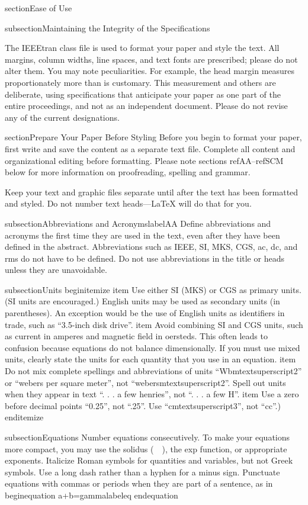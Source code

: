 section{Ease of Use}

subsection{Maintaining the Integrity of the Specifications}

The IEEEtran class file is used to format your paper and style the text. All margins, 
column widths, line spaces, and text fonts are prescribed; please do not 
alter them. You may note peculiarities. For example, the head margin
measures proportionately more than is customary. This measurement 
and others are deliberate, using specifications that anticipate your paper 
as one part of the entire proceedings, and not as an independent document. 
Please do not revise any of the current designations.

section{Prepare Your Paper Before Styling}
Before you begin to format your paper, first write and save the content as a 
separate text file. Complete all content and organizational editing before 
formatting. Please note sections ref{AA}--ref{SCM} below for more information on 
proofreading, spelling and grammar.

Keep your text and graphic files separate until after the text has been 
formatted and styled. Do not number text heads---{LaTeX} will do that 
for you.

subsection{Abbreviations and Acronyms}label{AA}
Define abbreviations and acronyms the first time they are used in the text, 
even after they have been defined in the abstract. Abbreviations such as 
IEEE, SI, MKS, CGS, ac, dc, and rms do not have to be defined. Do not use 
abbreviations in the title or heads unless they are unavoidable.

subsection{Units}
begin{itemize}
item Use either SI (MKS) or CGS as primary units. (SI units are encouraged.) English units may be used as secondary units (in parentheses). An exception would be the use of English units as identifiers in trade, such as ``3.5-inch disk drive''.
item Avoid combining SI and CGS units, such as current in amperes and magnetic field in oersteds. This often leads to confusion because equations do not balance dimensionally. If you must use mixed units, clearly state the units for each quantity that you use in an equation.
item Do not mix complete spellings and abbreviations of units ``Wbmtextsuperscript{2}'' or ``webers per square meter'', not ``webersmtextsuperscript{2}''. Spell out units when they appear in text ``. . . a few henries'', not ``. . . a few H''.
item Use a zero before decimal points ``0.25'', not ``.25''. Use ``cmtextsuperscript{3}'', not ``cc''.)
end{itemize}

subsection{Equations}
Number equations consecutively. To make your 
equations more compact, you may use the solidus (~~), the exp function, or 
appropriate exponents. Italicize Roman symbols for quantities and variables, 
but not Greek symbols. Use a long dash rather than a hyphen for a minus 
sign. Punctuate equations with commas or periods when they are part of a 
sentence, as in
begin{equation}
a+b=gammalabel{eq}
end{equation}

